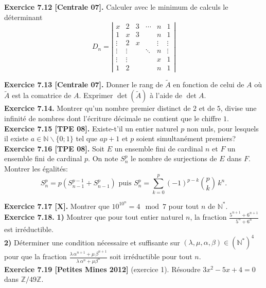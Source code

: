 \documentclass[a4paper,12pt,francais]{article}
\newcommand{\field}[1]{\mathbb{#1}}
\newcommand{\N}{\field{N}}
\newcommand{\Z}{\field{Z}}
\begin{document}
\noindent
{\bf Exercice 7.12 [Centrale 07].}  Calculer avec le minimum de calculs le déterminant
$$ D_n= \left| 
\begin{array}{cccccc}
x&2&3&\cdots&n&1\\
1&x&3& &n&1\\
\vdots& 2& x& & \vdots&\vdots\\
\vdots & \vdots& & \ddots& n& \vdots\\
\vdots&\vdots& &  & x & 1\\
1&2& & & n &1
\end{array} \right|$$

\noindent
{\bf Exercice 7.13 [Centrale 07].} Donner le rang de $\tilde{A}$ en fonction de celui de $A$ où  $\tilde{A}$ est la comatrice de $A$. Exprimer $\det(\tilde{A})$ à l'aide de $\det A$.\\

\noindent
{\bf Exercice 7.14.} Montrer qu'un nombre premier distinct de $2$ et de $5$, divise une infinité de nombres dont l'écriture décimale ne contient que le chiffre $1$.\\

\noindent
{\bf Exercice 7.15 [TPE 08].} Existe-t'il un entier naturel $p$ non nuls, pour lesquels il existe $a\in \N \backslash\{0;1\}$  tel que $ap+1$ et $p$ soient simultanément premiers?\\

\noindent
{\bf Exercice 7.16 [TPE 08].} Soit $E$ un ensemble fini de cardinal $n$ et $F$ un ensemble fini de cardinal $p$. On note $S_n^p$ le nombre de surjections de $E$ dans $F$. Montrer les égalités:
$$ S_n^p=p(S_{n-1}^{p-1}+S_{n-1}^p) \mbox{ puis } 
 S_n^p=\sum_{k=0}^p (-1)^{p-k} \binom{p}{k} \, k^n .$$

\noindent
{\bf Exercice 7.17 [X].} Montrer que $10^{10^n}=4 \mod 7$ pour tout $n$ de $\N^*$.\\

\noindent
{\bf Exercice 7.18.} {\bf 1)} Montrer que pour tout entier naturel $n$, la fraction $\displaystyle \frac{5^{n+1}+6^{n+1}}{5^n+6^n}$ est irréductible.\\
{\bf 2)} Déterminer une condition nécessaire et suffisante sur $(\lambda,\mu,\alpha,\beta)\in (\N^*)^4$ pour que la fraction $\displaystyle \frac{\lambda \, \alpha^{n+1}+\mu \, \beta^{n+1}}{\lambda\, \alpha^n+\mu \beta^n}$ soit irréductible pour tout $n$.\\

\noindent
{\bf Exercice 7.19 [Petites Mines 2012]} (exercice 1). Résoudre $3x^2-5x+4=0$ dans $\Z/49\Z$.\\
\end{document}
